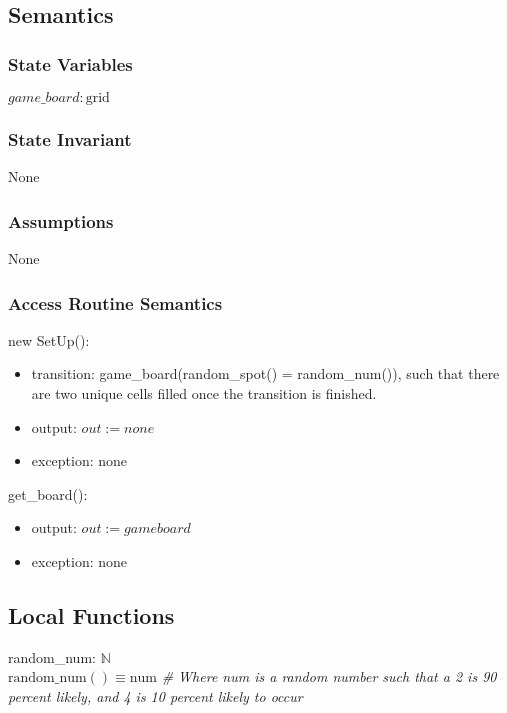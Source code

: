 \documentclass[12pt]{article}
\begin{document}
\subsection* {Semantics}

\subsubsection* {State Variables}

$\mathit{game\_board}: \text{grid}$

\subsubsection* {State Invariant}

None

\subsubsection* {Assumptions}

None

\subsubsection* {Access Routine Semantics}

\noindent new SetUp():
\begin{itemize}
\item transition: game\_board(random\_spot() = random\_num()), such that there are two unique cells filled once the transition is finished. 
\item output: $out := none$
\item exception: none
\end{itemize}

\noindent get\_board():
\begin{itemize}
\item output: $out := \mathit{gameboard}$
\item exception: none
\end{itemize}

\subsection*{Local Functions}

\noindent random\_num:  \rightarrow $\mathbb{N}$\\
\noindent $\mbox{random\_num}() \equiv \text{num} $
\textit{\# Where num is a random number such that a 2 is 90 percent likely, and 4 is 10 percent likely to occur} ~\\
\end{document}
